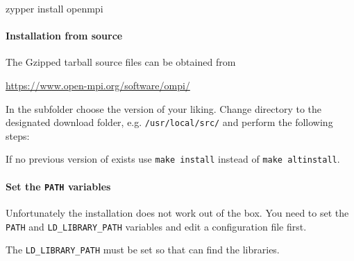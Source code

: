 \begin{code}
zypper install openmpi
\end{code}

\paragraph{Installation from source}

The Gzipped tarball source files can be obtained from

\href{https://www.open-mpi.org/software/ompi/}{https://www.open-mpi.org/software/ompi/}

In the subfolder choose the version of your liking. Change directory to the designated download folder, e.g. \verb+/usr/local/src/+ and perform the following steps:

\begingroup
\lstset{breaklines=true}
\endgroup

If no previous version of \marktool{\openmpiname} exists use \verb+make install+ instead of \verb+make altinstall+.

\paragraph{Set the \texttt{PATH} variables}

Unfortunately the \marktool{\openmpiname} installation does not work out of the box. You need to set the \verb+PATH+ and \verb+LD_LIBRARY_PATH+ variables and edit a configuration file first.

The \verb+LD_LIBRARY_PATH+ must be set so that  can find the \marktool{\openmpiname} libraries.%
%
%
%

